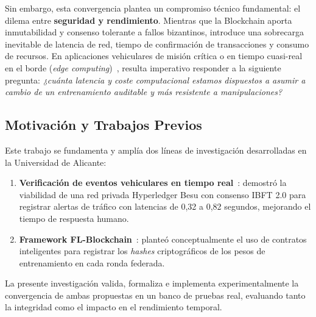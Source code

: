 Sin embargo, esta convergencia plantea un compromiso técnico fundamental: el dilema entre \textbf{seguridad y rendimiento}. Mientras que la Blockchain aporta inmutabilidad y consenso tolerante a fallos bizantinos, introduce una sobrecarga inevitable de latencia de red, tiempo de confirmación de transacciones y consumo de recursos. En aplicaciones vehiculares de misión crítica o en tiempo cuasi-real en el borde (\textit{edge computing})~\cite{liu2019edge}, resulta imperativo responder a la siguiente pregunta: \textit{¿cuánta latencia y coste computacional estamos dispuestos a asumir a cambio de un entrenamiento auditable y más resistente a manipulaciones?}

\subsection{Motivación y Trabajos Previos}
Este trabajo se fundamenta y amplía dos líneas de investigación desarrolladas en la Universidad de Alicante:
\begin{enumerate}
    \item \textbf{Verificación de eventos vehiculares en tiempo real}~\cite{pujol2024blockchain}: demostró la viabilidad de una red privada Hyperledger Besu con consenso IBFT 2.0 para registrar alertas de tráfico con latencias de 0,32 a 0,82 segundos, mejorando el tiempo de respuesta humano.
    \item \textbf{Framework FL-Blockchain}~\cite{cloudlabaia_flblockchain}: planteó conceptualmente el uso de contratos inteligentes para registrar los \textit{hashes} criptográficos de los pesos de entrenamiento en cada ronda federada.
\end{enumerate}

La presente investigación valida, formaliza e implementa experimentalmente la convergencia de ambas propuestas en un banco de pruebas real, evaluando tanto la integridad como el impacto en el rendimiento temporal.

